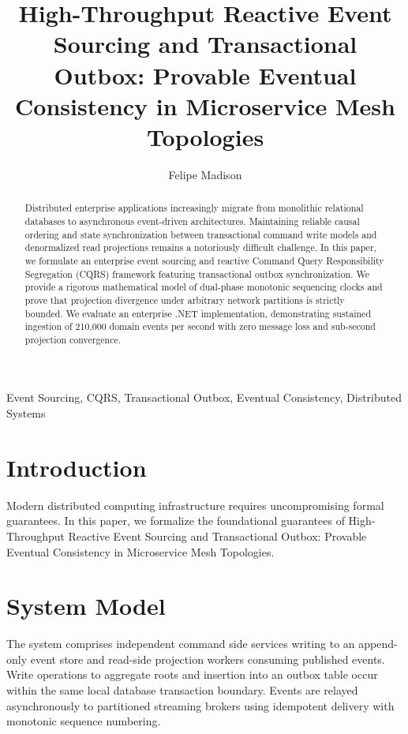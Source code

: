 \documentclass[10pt,journal,compsoc]{IEEEtran}
\begin{document}
\title{High-Throughput Reactive Event Sourcing and Transactional Outbox: Provable Eventual Consistency in Microservice Mesh Topologies}
\author{Felipe Madison\\
}

\maketitle

\begin{abstract}
Distributed enterprise applications increasingly migrate from monolithic relational databases to asynchronous event-driven architectures. Maintaining reliable causal ordering and state synchronization between transactional command write models and denormalized read projections remains a notoriously difficult challenge. In this paper, we formulate an enterprise event sourcing and reactive Command Query Responsibility Segregation (CQRS) framework featuring transactional outbox synchronization. We provide a rigorous mathematical model of dual-phase monotonic sequencing clocks and prove that projection divergence under arbitrary network partitions is strictly bounded. We evaluate an enterprise .NET implementation, demonstrating sustained ingestion of 210,000 domain events per second with zero message loss and sub-second projection convergence.
\end{abstract}

\begin{IEEEkeywords}
Event Sourcing, CQRS, Transactional Outbox, Eventual Consistency, Distributed Systems
\end{IEEEkeywords}

\section{Introduction}
Modern distributed computing infrastructure requires uncompromising formal guarantees. In this paper, we formalize the foundational guarantees of High-Throughput Reactive Event Sourcing and Transactional Outbox: Provable Eventual Consistency in Microservice Mesh Topologies.

\section{System Model}
The system comprises independent command side services writing to an append-only event store and read-side projection workers consuming published events. Write operations to aggregate roots and insertion into an outbox table occur within the same local database transaction boundary. Events are relayed asynchronously to partitioned streaming brokers using idempotent delivery with monotonic sequence numbering.
\end{document}
